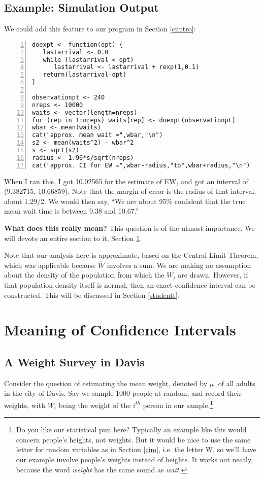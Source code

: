 \subsection{Example:  Simulation Output}

We could add this feature to our program in Section \ref{ciintro}:

\label{bussim}
\begin{Verbatim}[fontsize=\relsize{-2},numbers=left]
doexpt <- function(opt) {
   lastarrival <- 0.0
   while (lastarrival < opt) 
      lastarrival <- lastarrival + rexp(1,0.1)
   return(lastarrival-opt)
}

observationpt <- 240
nreps <- 10000
waits <- vector(length=nreps)
for (rep in 1:nreps) waits[rep] <- doexpt(observationpt)
wbar <- mean(waits)
cat("approx. mean wait =",wbar,"\n")
s2 <- mean(waits^2) - wbar^2
s <- sqrt(s2)
radius <- 1.96*s/sqrt(nreps)
cat("approx. CI for EW =",wbar-radius,"to",wbar+radius,"\n")
\end{Verbatim}

When I ran this, I got 10.02565 for the estimate of EW, and got an
interval of (9.382715, 10.66859).  Note that the margin of error is the
radius of that interval, about 1.29/2.  We would then say, ``We are about
95\% confident that the true mean wait time is between 9.38 and 10.67.''

{\bf What does this really mean?}  This question is of the utmost
importance.  We will devote an entire section to it, Section
\ref{cimeaning}. 

Note that our analysis here is approximate, based on the Central Limit
Theorem, which was applicable because $\overline{W}$ involves a sum.  We
are making no assumption about the density of the population from which
the $W_i$ are drawn.  However, if that population density itself is
normal, then an exact confidence interval can be constructed.  This will
be discussed in Section \ref{studentt}.

\section{Meaning of Confidence Intervals}
\label{cimeaning}

\subsection{A Weight Survey in Davis}
\label{davisweights}

Consider the question of estimating the mean weight, denoted by $\mu$, of
all adults in the city of Davis.  Say we sample 1000 people at random,
and record their weights, with $W_i$ being the weight of the $i^{th}$
person in our sample.\footnote{Do you like our statistical pun here?
Typically an example like this would concern people's heights, not
weights.  But it would be nice to use the same letter for random
variables as in Section \ref{cim}, i.e. the letter W, so we'll have our
example involve people's weights instead of heights.  It works out
neatly, because the word {\it weight} has the same sound as {\it wait}.}

